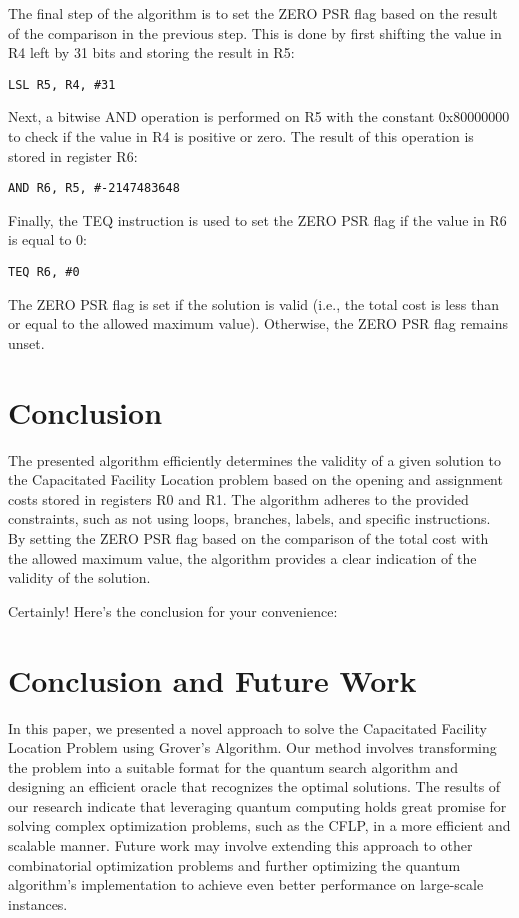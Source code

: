 The final step of the algorithm is to set the ZERO PSR flag based on the result of the comparison in the previous step. This is done by first shifting the value in R4 left by 31 bits and storing the result in R5:

\begin{verbatim}
LSL R5, R4, #31
\end{verbatim}

Next, a bitwise AND operation is performed on R5 with the constant 0x80000000 to check if the value in R4 is positive or zero. The result of this operation is stored in register R6:

\begin{verbatim}
AND R6, R5, #-2147483648
\end{verbatim}

Finally, the TEQ instruction is used to set the ZERO PSR flag if the value in R6 is equal to 0:

\begin{verbatim}
TEQ R6, #0
\end{verbatim}

The ZERO PSR flag is set if the solution is valid (i.e., the total cost is less than or equal to the allowed maximum value). Otherwise, the ZERO PSR flag remains unset.

\section{Conclusion}

The presented algorithm efficiently determines the validity of a given solution to the Capacitated Facility Location problem based on the opening and assignment costs stored in registers R0 and R1. The algorithm adheres to the provided constraints, such as not using loops, branches, labels, and specific instructions. By setting the ZERO PSR flag based on the comparison of the total cost with the allowed maximum value, the algorithm provides a clear indication of the validity of the solution.

Certainly! Here's the conclusion for your convenience:

\section{Conclusion and Future Work}

In this paper, we presented a novel approach to solve the Capacitated Facility Location Problem using Grover's Algorithm. Our method involves transforming the problem into a suitable format for the quantum search algorithm and designing an efficient oracle that recognizes the optimal solutions. The results of our research indicate that leveraging quantum computing holds great promise for solving complex optimization problems, such as the CFLP, in a more efficient and scalable manner. Future work may involve extending this approach to other combinatorial optimization problems and further optimizing the quantum algorithm's implementation to achieve even better performance on large-scale instances.

